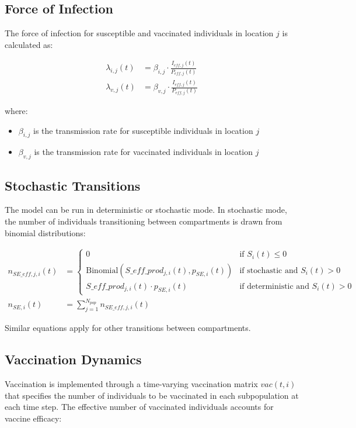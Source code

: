 \documentclass{article}
\begin{document}
\subsection{Force of Infection}

The force of infection for susceptible and vaccinated individuals in location $j$ is calculated as:

\begin{align}
\lambda_{i,j}(t) &= \beta_{i,j} \cdot \frac{I_{eff,j}(t)}{P_{eff,j}(t)} \\
\lambda_{v,j}(t) &= \beta_{v,j} \cdot \frac{I_{eff,j}(t)}{P_{eff,j}(t)}
\end{align}

where:
\begin{itemize}
    \item $\beta_{i,j}$ is the transmission rate for susceptible individuals in location $j$
    \item $\beta_{v,j}$ is the transmission rate for vaccinated individuals in location $j$
\end{itemize}

\subsection{Stochastic Transitions}

The model can be run in deterministic or stochastic mode. In stochastic mode, the number of individuals transitioning between compartments is drawn from binomial distributions:

\begin{align}
n_{SE\_eff,j,i}(t) &= 
\begin{cases}
0 & \text{if } S_i(t) \leq 0 \\
\text{Binomial}(S\_eff\_prod_{j,i}(t), p_{SE,i}(t)) & \text{if stochastic and } S_i(t) > 0 \\
S\_eff\_prod_{j,i}(t) \cdot p_{SE,i}(t) & \text{if deterministic and } S_i(t) > 0
\end{cases} \\
n_{SE,i}(t) &= \sum_{j=1}^{N_{pop}} n_{SE\_eff,j,i}(t)
\end{align}

Similar equations apply for other transitions between compartments.

\subsection{Vaccination Dynamics}

Vaccination is implemented through a time-varying vaccination matrix $vac(t, i)$ that specifies the number of individuals to be vaccinated in each subpopulation at each time step. The effective number of vaccinated individuals accounts for vaccine efficacy:
\end{document}
